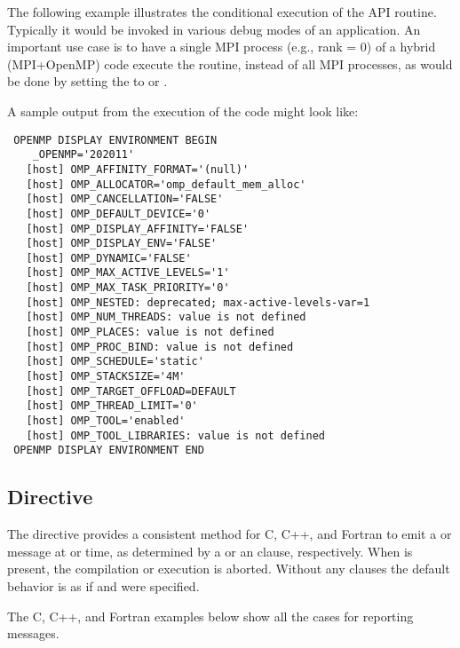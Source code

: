 The following example illustrates the conditional execution of the API
 routine.  Typically it would be invoked in
various debug modes of an application. 
An important use case is to have a single MPI process (e.g., rank = 0) 
of a hybrid (MPI+OpenMP) code execute the routine,
instead of all MPI processes, as would be done by 
setting the  to  or .


\clearpage

A sample output from the execution of the code might look like:
{\small\begin{verbatim}
 OPENMP DISPLAY ENVIRONMENT BEGIN
    _OPENMP='202011'
   [host] OMP_AFFINITY_FORMAT='(null)'
   [host] OMP_ALLOCATOR='omp_default_mem_alloc'
   [host] OMP_CANCELLATION='FALSE'
   [host] OMP_DEFAULT_DEVICE='0'
   [host] OMP_DISPLAY_AFFINITY='FALSE'
   [host] OMP_DISPLAY_ENV='FALSE'
   [host] OMP_DYNAMIC='FALSE'
   [host] OMP_MAX_ACTIVE_LEVELS='1'
   [host] OMP_MAX_TASK_PRIORITY='0'
   [host] OMP_NESTED: deprecated; max-active-levels-var=1
   [host] OMP_NUM_THREADS: value is not defined
   [host] OMP_PLACES: value is not defined
   [host] OMP_PROC_BIND: value is not defined
   [host] OMP_SCHEDULE='static'
   [host] OMP_STACKSIZE='4M'
   [host] OMP_TARGET_OFFLOAD=DEFAULT
   [host] OMP_THREAD_LIMIT='0'
   [host] OMP_TOOL='enabled'
   [host] OMP_TOOL_LIBRARIES: value is not defined
 OPENMP DISPLAY ENVIRONMENT END
\end{verbatim}}


\subsection{ Directive}
\label{subsec:error}

The  directive provides a consistent method for C, C++, and Fortran to emit a  or
 message at  or  time, as determined by a 
or an  clause, respectively. When  is present, the compilation 
or execution is aborted. Without any clauses the default behavior is as if  
and  were specified.

The C, C++, and Fortran examples below show all the cases for reporting messages.



